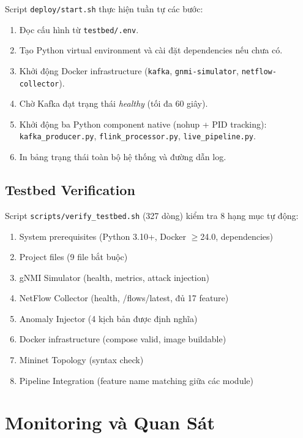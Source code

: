 \documentclass[12pt,a4paper]{article}
\begin{document}
Script \texttt{deploy/start.sh} thực hiện tuần tự các bước:

\begin{enumerate}[leftmargin=2em]
\item Đọc cấu hình từ \texttt{testbed/.env}.
\item Tạo Python virtual environment và cài đặt dependencies nếu chưa có.
\item Khởi động Docker infrastructure (\texttt{kafka}, \texttt{gnmi-simulator}, \texttt{netflow-collector}).
\item Chờ Kafka đạt trạng thái \textit{healthy} (tối đa 60 giây).
\item Khởi động ba Python component native (nohup + PID tracking):
      \texttt{kafka\_producer.py}, \texttt{flink\_processor.py}, \texttt{live\_pipeline.py}.
\item In bảng trạng thái toàn bộ hệ thống và đường dẫn log.
\end{enumerate}

\subsection{Testbed Verification}

Script \texttt{scripts/verify\_testbed.sh} (327 dòng) kiểm tra 8 hạng mục tự động:

\begin{enumerate}[leftmargin=2em, itemsep=0pt]
\item System prerequisites (Python 3.10+, Docker $\geq$24.0, dependencies)
\item Project files (9 file bắt buộc)
\item gNMI Simulator (health, metrics, attack injection)
\item NetFlow Collector (health, /flows/latest, đủ 17 feature)
\item Anomaly Injector (4 kịch bản được định nghĩa)
\item Docker infrastructure (compose valid, image buildable)
\item Mininet Topology (syntax check)
\item Pipeline Integration (feature name matching giữa các module)
\end{enumerate}

\section{Monitoring và Quan Sát}
\end{document}
